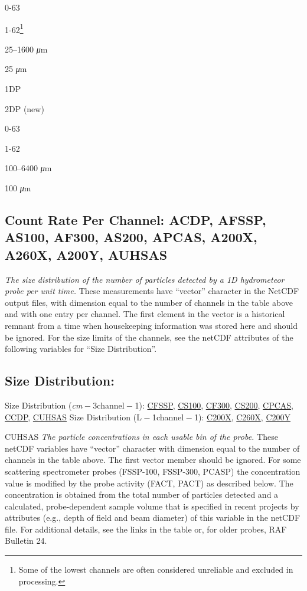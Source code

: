 \documentclass[
]{book}
\begin{document}
0-63

1-62\footnote{Some of the lowest channels are often considered unreliable and excluded in processing.}

25--1600 {\emph{μ}}m

25 {\emph{μ}}m

1DP

2DP (new)

0-63

1-62

100--6400 {\emph{μ}}m

100 {\emph{μ}}m

\hypertarget{CRPC}{%
\subsection*{Count Rate Per Channel: ACDP, AFSSP, AS100, AF300, AS200, APCAS, A200X, A260X, A200Y, AUHSAS}\label{CRPC}}

\emph{The size distribution of the number of particles detected by a 1D hydrometeor probe per unit time.} These measurements have ``vector'' character in the NetCDF output files, with dimension equal to the number of channels in the table above and with one entry per channel. The first element in the vector is a historical remnant from a time when housekeeping information was stored here and should be ignored. For the size limits of the channels, see the netCDF attributes of the following variables for ``Size Distribution''.

\uline{}

\hypertarget{size-distribution}{%
\subsection*{Size Distribution:}\label{size-distribution}}

Size Distribution ({\emph{cm} − 3}channel{ − 1}): \uline{CFSSP}, \uline{CS100}, \uline{CF300}, \uline{CS200}, \uline{CPCAS}, \uline{CCDP}, \uline{CUHSAS}
Size Distribution (L{ − 1}channel{ − 1}): \uline{C200X}, \uline{C260X}, \uline{C200Y}

\protect\hypertarget{CUHSAS}{}{CUHSAS}
\emph{The particle concentrations} \emph{in each usable bin of the probe.} These netCDF variables have ``vector'' character with dimension equal to the number of channels in the table above. The first vector member should be ignored. For some scattering spectrometer probes (FSSP-100, FSSP-300, PCASP) the concentration value is modified by the probe activity (FACT, PACT) as described below. The concentration is obtained from the total number of particles detected and a calculated, probe-dependent sample volume that is specified in recent projects by attributes (e.g., depth of field and beam diameter) of this variable in the netCDF file. For additional details, see the links in the table or, for older probes, RAF Bulletin 24.
\end{document}
